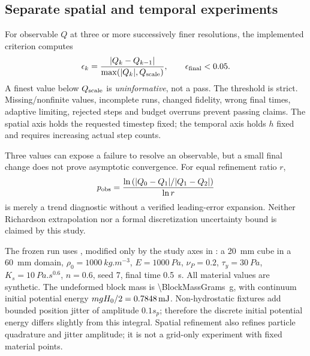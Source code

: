 \subsection{Separate spatial and temporal experiments}
For observable $Q$ at three or more successively finer resolutions, the
implemented criterion computes
\begin{equation}
 \epsilon_k=\frac{|Q_k-Q_{k-1}|}{\max(|Q_k|,Q_{\rm scale})},\qquad
 \epsilon_{\rm final}<0.05. \label{eq:refinement}
\end{equation}
A finest value below $Q_{\rm scale}$ is \emph{uninformative}, not a pass. The
threshold is strict. Missing/nonfinite values, incomplete runs, changed fidelity,
wrong final times, adaptive limiting, rejected steps and budget overruns prevent
passing claims. The spatial axis holds the requested timestep fixed; the temporal
axis holds $h$ fixed and requires increasing actual step counts.

Three values can expose a failure to resolve an observable, but a small final
change does not prove asymptotic convergence. For equal refinement ratio $r$,
\begin{equation}
 p_{\rm obs}=\frac{\ln\left(|Q_0-Q_1|/|Q_1-Q_2|\right)}{\ln r}
\end{equation}
is merely a trend diagnostic without a verified leading-error expansion.
Neither Richardson extrapolation nor a formal discretization uncertainty bound
is claimed by this study.

The frozen run uses , modified only by the
study axes in : a \SI{20}{mm} cube in a
\SI{60}{mm} domain, $\rho_0=\SI{1000}{kg.m^{-3}}$, $E=\SI{1000}{Pa}$,
$\nu_P=0.2$, $\tau_y=\SI{30}{Pa}$, $K_s=\SI{10}{Pa.s^{0.6}}$,
$n=0.6$, seed 7, final time \SI{0.5}{s}. All material values are synthetic.
The undeformed block mass is \SI{\BlockMassGrams}{g}, with continuum initial
potential energy $mgH_0/2=\SI{0.7848}{mJ}$.
Non-hydrostatic fixtures add bounded position jitter of amplitude $0.1s_p$;
therefore the discrete initial potential energy differs slightly from this
integral. Spatial refinement also refines particle quadrature and jitter
amplitude; it is not a grid-only experiment with fixed material points.

\begin{table}[htbp]
\centering\small

\caption{Actual compiled-kernel results at \SI{0.5}{s}, source revision
\nolinkurl{9a66a55}. Every case completed with zero limited and rejected steps.
Times and lengths here are requested caps/grid scales and measured final
surface proxies, respectively.}
\label{tab:cases}
\end{table}

